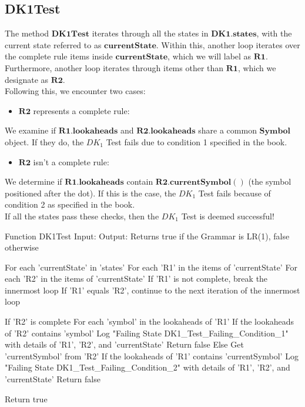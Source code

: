 \vspace{15pt}

\subsection{DK1Test}

The method \(\boldsymbol{DK1Test}\) iterates through all the states in \(\boldsymbol{DK1.states}\), with the current state referred to as \(\boldsymbol{currentState}\). Within this, another loop iterates over the complete rule items inside \(\boldsymbol{currentState}\), which we will label as \(\boldsymbol{R1}\). Furthermore, another loop iterates through items other than \(\boldsymbol{R1}\), which we designate as \(\boldsymbol{R2}\).\\

Following this, we encounter two cases:
\begin{itemize}
    \item \(\boldsymbol{R2}\) represents a complete rule:
\end{itemize}

We examine if \(\boldsymbol{R1.lookaheads}\) and \(\boldsymbol{R2.lookaheads}\) share a common \(\boldsymbol{Symbol}\) object. If they do, the \(DK_{1}\) Test fails due to condition 1 specified in the book.

\begin{itemize}
    \item \(\boldsymbol{R2}\) isn't a complete rule:
\end{itemize}

We determine if \(\boldsymbol{R1.lookaheads}\) contain \(\boldsymbol{R2.currentSymbol()}\) (the symbol positioned after the dot). If this is the case, the \(DK_{1}\) Test fails because of condition 2 as specified in the book.\\

If all the states pass these checks, then the \(DK_{1}\) Test is deemed successful!\\

\begin{codeblock}
    Function DK1Test
    Input:
    Output: Returns true if the Grammar is LR(1), false otherwise

    For each 'currentState' in 'states'
    For each 'R1' in the items of 'currentState'
    For each 'R2' in the items of 'currentState'
    If 'R1' is not complete, break the innermost loop
    If 'R1' equals 'R2', continue to the next iteration of the innermost loop

    If 'R2' is complete
    For each 'symbol' in the lookaheads of 'R1'
    If the lookaheads of 'R2' contains 'symbol'
    Log "Failing State DK1_Test_Failing_Condition_1" with details of 'R1', 'R2', and 'currentState'
    Return false
    Else
    Get 'currentSymbol' from 'R2'
    If the lookaheads of 'R1' contains 'currentSymbol'
    Log "Failing State DK1_Test_Failing_Condition_2" with details of 'R1', 'R2', and 'currentState'
    Return false

    Return true
\end{codeblock}

